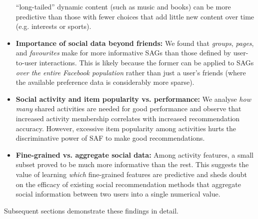 \begin{itemize}
``long-tailed'' dynamic content (such as music and books) can be more
predictive than those with fewer choices that add little new content
over time (e.g. interests or sports).
\item {\bf Importance of social data beyond friends:} 
We found that \emph{groups}, \emph{pages}, and \emph{favourites} 
make for more informative SAGs than those defined by user-to-user
interactions.  This is likely because the former can be applied to
SAGs \emph{over the entire Facebook population} rather than just a
user's friends (where the available preference data is considerably
more sparse).
\item {\bf Social activity and item popularity vs. performance:} 
We analyse \emph{how many} shared activities are needed for good
performance and observe that increased activity membership correlates
with increased recommendation accuracy.  However, excessive item
popularity among activities hurts the discriminative power of SAF to
make good recommendations.
\item {\bf Fine-grained vs. aggregate social data:}
Among activity features, a small subset proved to be much more informative
than the rest.  This suggests the value of
learning \emph{which} fine-grained features are predictive and sheds
doubt on the efficacy of existing social recommendation methods that
aggregate social information between two users into a single numerical
value.
\end{itemize}
Subsequent sections demonstrate these findings in detail.




